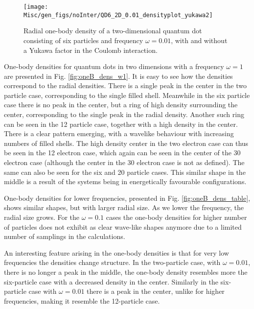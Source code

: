 \begin{figure}
		\begin{centering}
			\texttt{[image: Misc/gen\_figs/noInter/QD6\_2D\_0.01\_densityplot\_yukawa2]}
		\par\end{centering}
\protect\caption{Radial one-body density of a two-dimensional quantum dot consisting of six particles and frequency $\omega=0.01$, with and without a Yukawa factor in the Coulomb interaction. \label{fig:yukawa_interaction}}

	\end{figure}

	One-body densities for quantum dots in two dimensions with a frequency $\omega=1$ are presented in Fig. \ref{fig:oneB_dens_w1}. It is easy to see how the densities correspond to the radial densities. There is a single peak in the center in the two particle case, corresponding to the single filled shell. Meanwhile in the six particle case there is no peak in the center, but a ring of high density surrounding the center, corresponding to the single peak in the radial density. Another such ring can be seen in the 12 particle case, together with a high density in the center. There is a clear pattern emerging, with a wavelike behaviour with increasing numbers of filled shells. The high density center in the two electron case can thus be seen in the 12 electron case, which again can be seen in the center of the 30 electron case (although the center in the 30 electron case is not as defined). The same can also be seen for the six and 20 particle cases. This similar shape in the middle is a result of the systems being in energetically favourable configurations. 

	One-body densities for lower frequencies, presented in Fig. \ref{fig:oneB_dens_table}, shows similar shapes, but with larger radial size. As we lower the frequency, the radial size grows. For the $\omega=0.1$ cases the one-body densities for higher number of particles does not exhibit as clear wave-like shapes anymore due to a limited number of samplings in the calculations. 

	An interesting feature arising in the one-body densities is that for very low frequencies the densities change structure. In the two-particle case, with $\omega=0.01$, there is no longer a peak in the middle, the one-body density resembles more the six-particle case with a decreased density in the center. Similarly in the six-particle case with $\omega=0.01$ there is a peak in the center, unlike for higher frequencies, making it resemble the 12-particle case.

